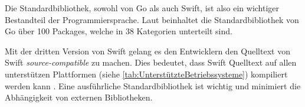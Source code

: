 Die Standardbibliothek, sowohl von Go als auch Swift, ist also ein wichtiger Bestandteil der Programmiersprache. 
Laut \cite[S.185]{Kennedy.2016} beinhaltet die Standardbibliothek von Go über 100 Packages, welche in 38 Kategorien unterteilt sind.

Mit der dritten Version von Swift gelang es den Entwicklern den Quelltext von Swift \textit{source-compatible} zu machen.
Dies bedeutet, dass Swift Quelltext auf allen unterstützen Plattformen (siehe \autoref{tab:UnterstützteBetriebssysteme}) kompiliert werden kann \cite[S.8]{Hoffman.2017}.
Eine ausführliche Standardbibliothek ist wichtig und minimiert die Abhängigkeit von externen Bibliotheken.



